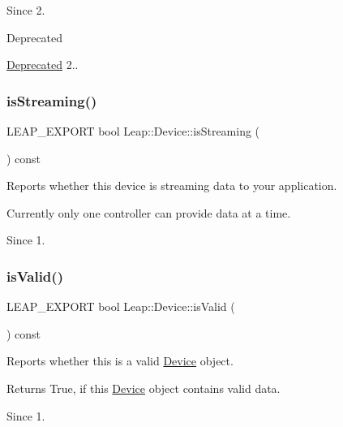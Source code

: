 \begin{DoxySince}{Since}
2. 
\end{DoxySince}
\begin{DoxyRefDesc}{Deprecated}
\item[\hyperlink{deprecated__deprecated000003}{Deprecated}]2.. \end{DoxyRefDesc}
\mbox{\label{class_leap_1_1_device_a0a3998a6914e09f1bcfb7e8d623bea37}} 
\subsubsection{\texorpdfstring{is\+Streaming()}{isStreaming()}}
{\footnotesize\ttfamily L\+E\+A\+P\+\_\+\+E\+X\+P\+O\+RT bool Leap\+::\+Device\+::is\+Streaming (\begin{DoxyParamCaption}{ }\end{DoxyParamCaption}) const}

Reports whether this device is streaming data to your application.

Currently only one controller can provide data at a time. \begin{DoxySince}{Since}
1. 
\end{DoxySince}
\mbox{\label{class_leap_1_1_device_a3de3767cbfc2a4f24cefa99d363d15ea}} 
\subsubsection{\texorpdfstring{is\+Valid()}{isValid()}}
{\footnotesize\ttfamily L\+E\+A\+P\+\_\+\+E\+X\+P\+O\+RT bool Leap\+::\+Device\+::is\+Valid (\begin{DoxyParamCaption}{ }\end{DoxyParamCaption}) const}

Reports whether this is a valid \hyperlink{class_leap_1_1_device}{Device} object.


\begin{DoxyCodeInclude}
\end{DoxyCodeInclude}


\begin{DoxyReturn}{Returns}
True, if this \hyperlink{class_leap_1_1_device}{Device} object contains valid data. 
\end{DoxyReturn}
\begin{DoxySince}{Since}
1. 
\end{DoxySince}
\mbox{\label{class_leap_1_1_device_aac05d238cd18a9d790d65adcf328cd96}} 
